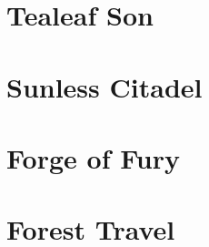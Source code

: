 

\begin{multicols}{2}

\section{Tealeaf Son}


\section{Sunless Citadel}


\section{Forge of Fury}


\section{Forest Travel}


\end{multicols}
